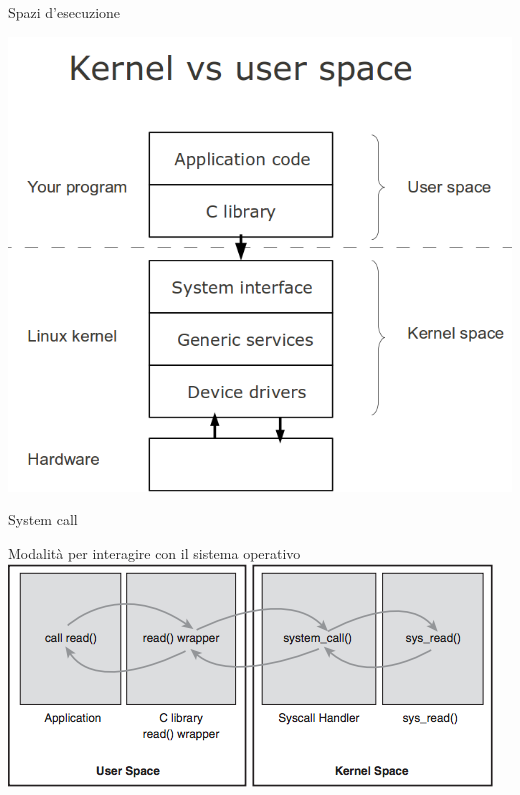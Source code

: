 \documentclass[12pt]{beamer}
\begin{document}
  \begin{frame}[fragile]{Spazi d'esecuzione}
    \begin{center}
    	\includegraphics[scale=1.0]{res/Spaces}
    \end{center}
  \end{frame}
  
  \begin{frame}[fragile]{System call}
    \begin{center}
    	Modalità per interagire con il sistema operativo
    	\vfill
    	\includegraphics[scale=0.5]{res/Syscall2}
    \end{center}
  \end{frame}
\end{document}
